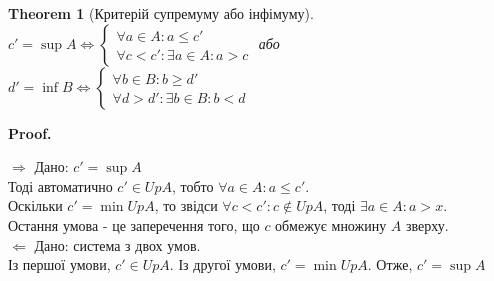 \documentclass[a4paper, 14pt]{article}
\makeatletter
\def\qed{$\blacksquare$}
\def\rightproof{$\boxed{\Rightarrow}$ }
\def\leftproof{$\boxed{\Leftarrow}$ }
\theoremstyle{theoremdd}
\newtheorem{theorem}{Theorem}[subsection]
\theoremstyle{theoremdd}
\theoremstyle{theoremdd}
\theoremstyle{theoremdd}
\theoremstyle{theoremdd}
\theoremstyle{theoremdd}
\theoremstyle{theoremdd}
\theoremstyle{theoremdd}
\renewenvironment{proof}[1][Proof.\\]{\par
\pushQED{\hfill \qed}%
\normalfont \topsep6\p@\@plus6\p@\relax
\trivlist
\item\relax
{\bfseries
#1\@addpunct{.}}\hspace\labelsep\ignorespaces
}{%
\popQED\endtrivlist\@endpefalse
}
\makeatother
\begin{document}
	\begin{theorem}[Критерій супремуму або інфімуму]
		$c' = \sup A \iff \begin{cases}
	 \forall a \in A: a \leq c' \\
	 \forall c < c': \exists a \in A: a > c
	\end{cases}$ \hspace{0.1cm} або \hspace{0.1cm}
	$d' = \inf B \iff \begin{cases} 
	 \forall b \in B: b \geq d'\\
	 \forall d > d': \exists b \in B: b < d
	\end{cases}$
	\begin{figure}[H]
	\centering
	\qquad
	\end{figure}
	\end{theorem}
	
	\begin{proof}
	\rightproof Дано: $c' = \sup A$\\
	Тоді автоматично $c' \in UpA$, тобто $\forall a \in A: a \leq c'$.\\
	Оскільки $c' = \min Up A$, то звідси $\forall c < c': c \not\in UpA$, тоді $\exists a \in A: a > x$.\\
	Остання умова - це заперечення того, що $c$ обмежує множину $A$ зверху.
	\bigskip \\
	
	\leftproof Дано: система з двох умов.\\
	Із першої умови, $c' \in UpA$. Із другої умови, $c' = \min Up A$. Отже, $c' = \sup A$
	\end{proof}
	
\end{document}
